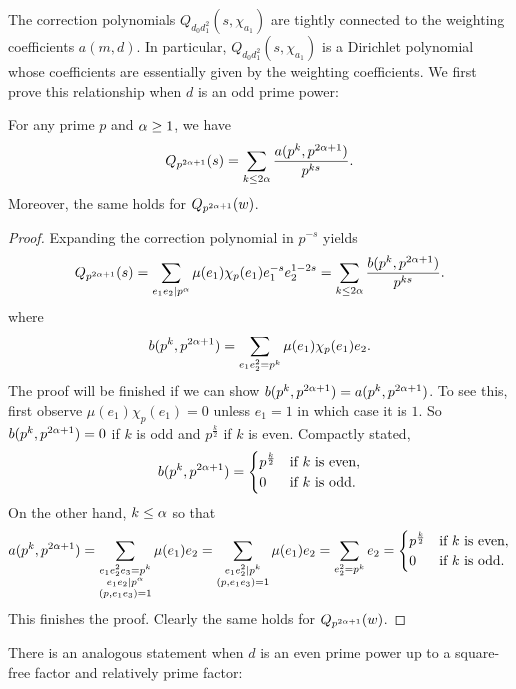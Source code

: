 \documentclass[12pt,reqno,oneside]{amsart}
\begin{document}
    The correction polynomials $Q_{d_{0}d_{1}^{2}}(s,\chi_{a_{1}})$ are tightly connected to the weighting coefficients $a(m,d)$. In particular, $Q_{d_{0}d_{1}^{2}}(s,\chi_{a_{1}})$ is a Dirichlet polynomial whose coefficients are essentially given by the weighting coefficients. We first prove this relationship when $d$ is an odd prime power:

    \begin{lemma}\label{lem:prime_correction_odd}
        For any prime $p$ and $\alpha \ge 1$, we have
        \[
            Q_{p^{2\alpha+1}}(s) = \sum_{k \le 2\alpha}\frac{a(p^{k},p^{2\alpha+1})}{p^{ks}}.
        \]
        Moreover, the same holds for $Q_{p^{2\alpha+1}}(w)$.
    \end{lemma}
    \begin{proof}
        Expanding the correction polynomial in $p^{-s}$ yields
        \[
            Q_{p^{2\alpha+1}}(s) = \sum_{e_{1}e_{2} \mid p^{\alpha}}\mu(e_{1})\chi_{p}(e_{1})e_{1}^{-s}e_{2}^{1-2s} = \sum_{k \le 2\alpha}\frac{b(p^{k},p^{2\alpha+1})}{p^{ks}}.
        \]
        where
        \[
            b(p^{k},p^{2\alpha+1}) = \sum_{e_{1}e_{2}^{2} = p^{k}}\mu(e_{1})\chi_{p}(e_{1})e_{2}.
        \]
        The proof will be finished if we can show $b(p^{k},p^{2\alpha+1}) = a(p^{k},p^{2\alpha+1})$. To see this, first observe $\mu(e_{1})\chi_{p}(e_{1}) = 0$ unless $e_{1} = 1$ in which case it is $1$. So $b(p^{k},p^{2\alpha+1}) = 0$ if $k$ is odd and $p^{\frac{k}{2}}$ if $k$ is even. Compactly stated,
        \[
            b(p^{k},p^{2\alpha+1}) = \begin{cases} p^{\frac{k}{2}} & \text{if $k$ is even}, \\ 0 & \text{if $k$ is odd}. \end{cases}
        \]
        On the other hand, $k \le \alpha$ so that
        \[
            a(p^{k},p^{2\alpha+1}) = \sum_{\substack{e_{1}e_{2}^{2}e_{3} = p^{k} \\ e_{1}e_{2} \mid p^{\alpha} \\ (p,e_{1}e_{3}) = 1}}\mu(e_{1})e_{2} = \sum_{\substack{e_{1}e_{2}^{2} \mid p^{k} \\ (p,e_{1}e_{3}) = 1}}\mu(e_{1})e_{2} = \sum_{e_{2}^{2} = p^{k}}e_{2} =  \begin{cases} p^{\frac{k}{2}} & \text{if $k$ is even}, \\ 0 & \text{if $k$ is odd}. \end{cases}
        \]
        This finishes the proof. Clearly the same holds for $Q_{p^{2\alpha+1}}(w)$.
    \end{proof}

    There is an analogous statement when $d$ is an even prime power up to a square-free factor and relatively prime factor:
    
\end{document}
